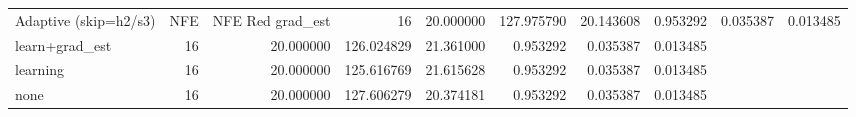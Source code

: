 \begin{tabular}{lrrrrrrr}
\toprule
Adaptive (skip=h2/s3) & NFE & NFE Red %
\midrule
grad_est & 16 & 20.000000 & 127.975790 & 20.143608 & 0.953292 & 0.035387 & 0.013485 \\
learn+grad_est & 16 & 20.000000 & 126.024829 & 21.361000 & 0.953292 & 0.035387 & 0.013485 \\
learning & 16 & 20.000000 & 125.616769 & 21.615628 & 0.953292 & 0.035387 & 0.013485 \\
none & 16 & 20.000000 & 127.606279 & 20.374181 & 0.953292 & 0.035387 & 0.013485 \\
\bottomrule
\end{tabular}
